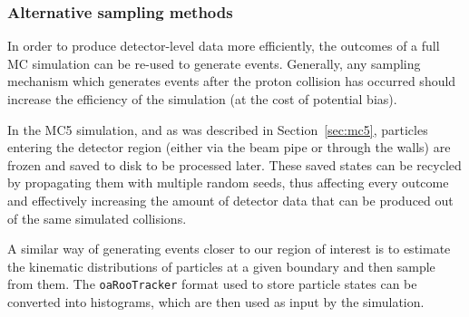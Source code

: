


\subsubsection{Alternative sampling methods}
In order to produce detector-level data more efficiently, the outcomes of a full MC simulation can be re-used to generate events. Generally, any sampling mechanism which generates events after the proton collision has occurred should increase the efficiency of the simulation (at the cost of potential bias).

In the MC5 simulation, and as was described in Section~\ref{sec:mc5}, particles entering the detector region (either via the beam pipe or through the walls) are frozen and saved to disk to be processed later. These saved states can be recycled by propagating them with multiple random seeds, thus affecting every outcome and effectively increasing the amount of detector data that can be produced out of the same simulated collisions. %

A similar way of generating events closer to our region of interest is to estimate the kinematic distributions of particles at a given boundary and then sample from them. The \texttt{oaRooTracker} format used to store particle states can be converted into histograms, which are then used as input by the simulation.



